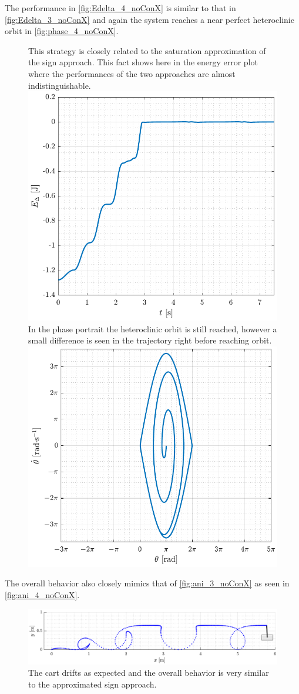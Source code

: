 The performance in \autoref{fig:Edelta_4_noConX} is similar to that in \autoref{fig:Edelta_3_noConX} and again the system reaches a near perfect heteroclinic orbit in \autoref{fig:phase_4_noConX}.
%
\begin{figure}[H]
  \hspace{-10pt}
  \captionbox
  {
    This strategy is closely related to the saturation approximation of the sign approach. This fact shows here in the energy error plot where the performances of the two approaches are almost indistinguishable.
    \label{fig:Edelta_4_noConX}
  }
  {
    \hspace{-1cm}
    \includegraphics[width=.448\textwidth]{figures/Edelta_4_noConX}
  }
  \hspace{20pt}
  \captionbox 
  {
    In the phase portrait the heteroclinic orbit is still reached, however a small difference is seen in the trajectory right before reaching orbit.
    \label{fig:phase_4_noConX}
  }
  {
    \hspace{-1cm}
    \includegraphics[width=.46\textwidth]{figures/phase_4_noConX}
  }  
\end{figure}
%
The overall behavior also closely mimics that of \autoref{fig:ani_3_noConX} as seen in \autoref{fig:ani_4_noConX}.
\begin{figure}[H]
  \includegraphics[width=.7\textwidth]{figures/ani_4_noConX}
  \caption{The cart drifts as expected and the overall behavior is very similar to the approximated sign approach.}
  \label{fig:ani_4_noConX}
\end{figure}
